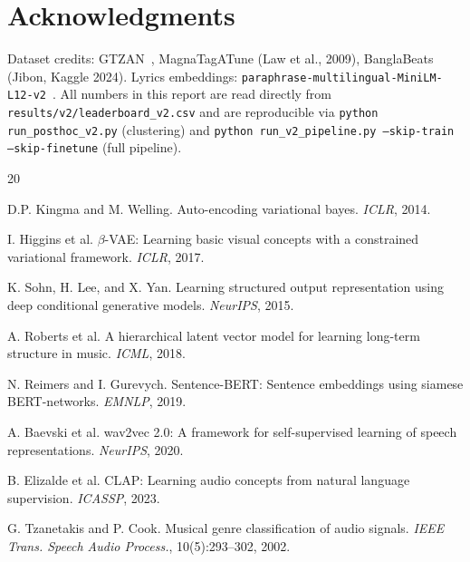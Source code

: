 \documentclass{article}
\begin{document}
\section*{Acknowledgments}
Dataset credits: GTZAN~\cite{tzanetakis2002musical}, MagnaTagATune (Law et al., 2009),
BanglaBeats (Jibon, Kaggle 2024).
Lyrics embeddings: \texttt{paraphrase-multilingual-MiniLM-L12-v2}~\cite{reimers2019sentence}.
All numbers in this report are read directly from
\texttt{results/v2/leaderboard\_v2.csv} and are reproducible via
\texttt{python run\_posthoc\_v2.py} (clustering) and
\texttt{python run\_v2\_pipeline.py --skip-train --skip-finetune} (full pipeline).

\clearpage

\begin{thebibliography}{20}

D.P. Kingma and M. Welling.
\newblock Auto-encoding variational bayes.
\newblock \textit{ICLR}, 2014.

I. Higgins et al.
\newblock $\beta$-VAE: Learning basic visual concepts with a constrained variational framework.
\newblock \textit{ICLR}, 2017.

K. Sohn, H. Lee, and X. Yan.
\newblock Learning structured output representation using deep conditional generative models.
\newblock \textit{NeurIPS}, 2015.

A. Roberts et al.
\newblock A hierarchical latent vector model for learning long-term structure in music.
\newblock \textit{ICML}, 2018.

N. Reimers and I. Gurevych.
\newblock Sentence-BERT: Sentence embeddings using siamese BERT-networks.
\newblock \textit{EMNLP}, 2019.

A. Baevski et al.
\newblock wav2vec 2.0: A framework for self-supervised learning of speech representations.
\newblock \textit{NeurIPS}, 2020.

B. Elizalde et al.
\newblock CLAP: Learning audio concepts from natural language supervision.
\newblock \textit{ICASSP}, 2023.

G. Tzanetakis and P. Cook.
\newblock Musical genre classification of audio signals.
\newblock \textit{IEEE Trans. Speech Audio Process.}, 10(5):293--302, 2002.


\end{thebibliography}
\end{document}
